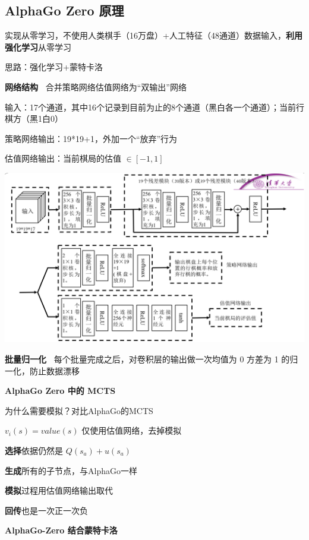 \documentclass[b4paper, 10pt]{ctexart}
\makeatletter
\newenvironment{figurehere}
{\def\@captype{figure}}
{}
\makeatother
\begin{document}
\begin{multicols}{3}
\subsection{AlphaGo Zero 原理}
实现从零学习，不使用人类棋手（16万盘）+人工特征（48通道）数据输入，\textbf{利用强化学习}从零学习

思路：强化学习+蒙特卡洛


\textbf{网络结构\ } 合并策略网络估值网络为“双输出”网络 

输入：17个通道，其中16个记录到目前为止的8个通道（黑白各一个通道）；当前行棋方（黑1白0）

策略网络输出：19*19+1，外加一个“放弃”行为

估值网络输出：当前棋局的估值 $\in [-1,1]$

\begin{figurehere}
    \centering    \includegraphics[width=0.99\linewidth]{figs/AlphaGo-Zero.png}
    \label{fig:AlphaGo-Zero}
\end{figurehere}

\textbf{批量归一化\ } 每个批量完成之后，对卷积层的输出做一次均值为 0 方差为 1 的归一化，防止数据漂移

\textbf{AlphaGo Zero 中的 MCTS\ }

为什么需要模拟？对比AlphaGo的MCTS

$v_i(s)=value(s)$ 仅使用估值网络，去掉模拟

\textbf{选择}依据仍然是 $Q(s_a)+u(s_a)$

\textbf{生成}所有的子节点，与AlphaGo一样

\textbf{模拟}过程用估值网络输出取代

\textbf{回传}也是一次正一次负

\textbf{AlphaGo-Zero 结合蒙特卡洛\ }


\end{multicols}
\end{document}
